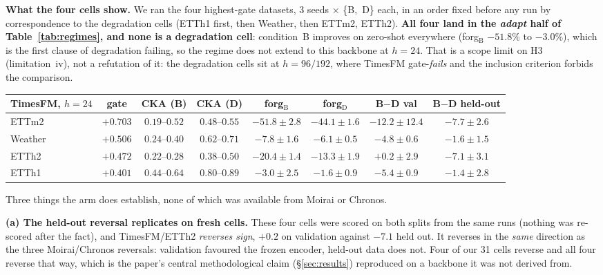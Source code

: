 \documentclass{article}
\begin{document}
\textbf{What the four cells show.} We ran the four highest-gate datasets, 3 seeds $\times$
\{B,~D\} each, in an order fixed before any run by correspondence to the degradation cells
(ETTh1 first, then Weather, then ETTm2, ETTh2). \textbf{All four land in the \emph{adapt} half of
Table~\ref{tab:regimes}, and none is a degradation cell}: condition~B improves on zero-shot
everywhere (forg$_\text{B}$ $-51.8\%$ to $-3.0\%$), which is the first clause of degradation failing,
so the regime does not extend to this backbone at $h{=}24$. That is a scope limit on H3
(limitation~iv), not a refutation of it: the degradation cells sit at $h{=}96/192$, where TimesFM
gate-\emph{fails} and the inclusion criterion forbids the comparison.

\begin{center}
\footnotesize
\setlength{\tabcolsep}{4pt}
\begin{tabular}{@{}lccccccc@{}}
\toprule
TimesFM, $h{=}24$ & gate & CKA (B) & CKA (D) & forg$_\text{B}$ & forg$_\text{D}$ & B$-$D val & B$-$D held-out \\
\midrule
ETTm2 & $+0.703$ & $0.19$--$0.52$ & $0.48$--$0.55$ & $-51.8{\pm}2.8$ & $-44.1{\pm}1.6$ & $-12.2{\pm}12.4$ & $\mathbf{-7.7{\pm}2.6}$ \\
Weather & $+0.506$ & $0.24$--$0.40$ & $0.62$--$0.71$ & $-7.8{\pm}1.6$ & $-6.1{\pm}0.5$ & $-4.8{\pm}0.6$ & $\mathbf{-1.6{\pm}1.5}$ \\
ETTh2 & $+0.472$ & $0.22$--$0.28$ & $0.38$--$0.50$ & $-20.4{\pm}1.4$ & $-13.3{\pm}1.9$ & $+0.2{\pm}2.9$ & $\mathbf{-7.1{\pm}3.1}$ \\
ETTh1 & $+0.401$ & $0.44$--$0.64$ & $0.80$--$0.89$ & $-3.0{\pm}2.5$ & $-1.6{\pm}0.9$ & $-5.4{\pm}0.9$ & $\mathbf{-1.4{\pm}2.8}$ \\
\bottomrule
\end{tabular}
\end{center}

\noindent Three things the arm does establish, none of which was available from Moirai or Chronos.

\textbf{(a) The held-out reversal replicates on fresh cells.} These four cells were scored on both
splits from the same runs (nothing was re-scored after the fact), and TimesFM/ETTh2 \emph{reverses
sign}, $+0.2$ on validation against $-7.1$ held out. It reverses in the \emph{same} direction as the
three Moirai/Chronos reversals: validation favoured the frozen encoder, held-out data does not. Four
of our 31 cells reverse and all four reverse that way, which is the paper's central methodological
claim (\S\ref{sec:results}) reproduced on a backbone it was not derived from.
\end{document}
